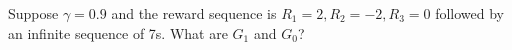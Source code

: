 Suppose $\gamma = 0.9$ and the reward sequence is $R_{1} = 2, R_{2}=-2, R_{3} = 0$ followed by an infinite sequence of 7s. What are $G_{1}$ and $G_{0}$?
\smallspace